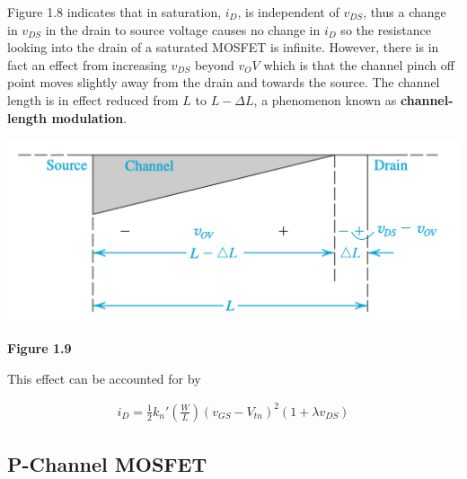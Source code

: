 \documentclass[12pt]{article}
\begin{document}
    Figure 1.8 indicates that in saturation, $i_D$, is independent of $v_{DS}$, thus a change in 
    $v_{DS}$ in the drain to source voltage causes no change in $i_D$ so the resistance looking 
    into the drain of a saturated MOSFET is infinite. However, there is in fact an effect from
    increasing $v_{DS}$ beyond $v_OV$ which is that the channel pinch off point moves slightly 
    away from the drain and towards the source. The channel length is in effect reduced from 
    $L$ to $L-\Delta L$, a phenomenon known as \textbf{channel-length modulation}. 

    \begin{center}
        \centerline{\includegraphics[scale=0.5]{figures/fig16.png}}
        \textbf{Figure 1.9}
    \end{center}
    
    This effect can be accounted for by

    \begin{align}
        i_D = \frac{1}{2}k_n'\left(\frac{W}{L}\right)(v_{GS}-V_{tn})^2(1+\lambda v_{DS})
    \end{align}

    \subsection*{P-Channel MOSFET}
\end{document}
